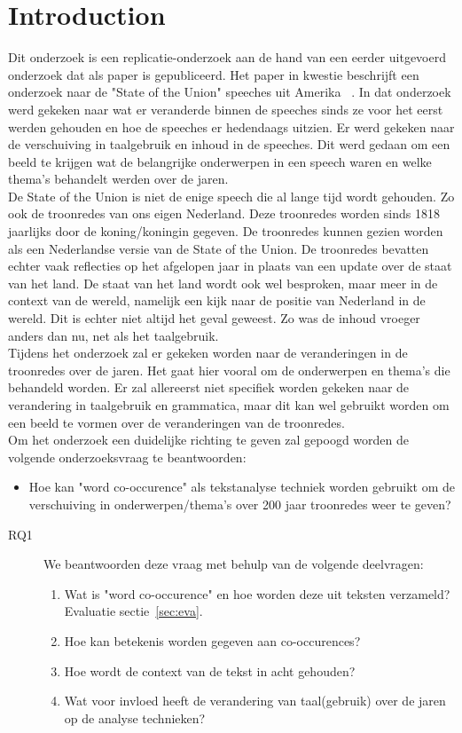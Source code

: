 \section{Introduction}
\label{sec:intro}

Dit onderzoek is een replicatie-onderzoek aan de hand van een eerder uitgevoerd onderzoek dat als paper is gepubliceerd. Het paper in kwestie beschrijft een onderzoek naar de "State of the Union" speeches uit Amerika ~\cite{state}. In dat onderzoek werd gekeken naar wat er veranderde binnen de speeches sinds ze voor het eerst werden gehouden en hoe de speeches er hedendaags uitzien. Er werd gekeken naar de verschuiving in taalgebruik en inhoud in de speeches. Dit werd gedaan om een beeld te krijgen wat de belangrijke onderwerpen in een speech waren en welke thema's behandelt werden over de jaren.
\\
De State of the Union is niet de enige speech die al lange tijd wordt gehouden. Zo ook de troonredes van ons eigen Nederland. Deze troonredes worden sinds 1818 jaarlijks door de koning/koningin gegeven. De troonredes kunnen gezien worden als een Nederlandse versie van de State of the Union. De troonredes bevatten echter vaak reflecties op het afgelopen jaar in plaats van een update over de staat van het land. De staat van het land wordt ook wel besproken, maar meer in de context van de wereld, namelijk een kijk naar de positie van Nederland in de wereld. Dit is echter niet altijd het geval geweest. Zo was de inhoud vroeger anders dan nu, net als het taalgebruik.
\\
Tijdens het onderzoek zal er gekeken worden naar de veranderingen in de troonredes over de jaren. Het gaat hier vooral om de onderwerpen en thema's die behandeld worden. Er zal allereerst niet specifiek worden gekeken naar de verandering in taalgebruik en grammatica, maar dit kan wel gebruikt worden om een beeld te vormen over de veranderingen van de troonredes.
\\
Om het onderzoek een duidelijke richting te geven zal gepoogd worden de volgende onderzoeksvraag te beantwoorden:

\begin{itemize}
\item Hoe kan "word co-occurence" als tekstanalyse techniek worden gebruikt om de verschuiving in onderwerpen/thema's over 200 jaar troonredes weer te geven?
\end{itemize}

\begin{description}
\item[RQ1]  We   beantwoorden deze vraag met behulp van de volgende deelvragen:
\begin{enumerate}
\item Wat is "word co-occurence" en hoe worden deze uit teksten verzameld? Evaluatie sectie~\ref{sec:eva}.
\item Hoe kan betekenis worden gegeven aan co-occurences?
\item Hoe wordt de context van de tekst in acht gehouden?
\item Wat voor invloed heeft de verandering van taal(gebruik) over de jaren op de analyse technieken?
\end{enumerate}
\end{description}

